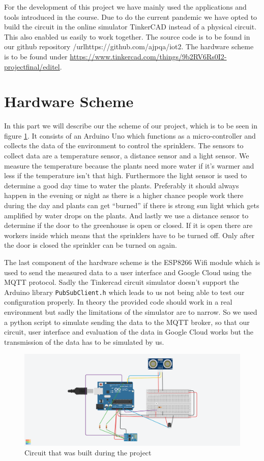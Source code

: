 \documentclass{article}
\begin{document}
For the development of this project we have mainly used the applications and tools introduced in the course. Due to do the current pandemic we have opted to build the circuit in the online simulator TinkerCAD instead of a physical circuit. This also enabled us easily to work together. The source code is to be found in our github repository /url{https://github.com/ajpqa/iot2}. The hardware scheme is to be found under \url{https://www.tinkercad.com/things/9b2RV6Rs0I2-projectfinal/editel}.

\section{Hardware Scheme}
In this part we will describe our the scheme of our project, which is to be seen in figure \ref{fig:scheme}. It consists of an Arduino Uno which functions as a micro-controller and collects the data of the environment to control the sprinklers. The sensors to collect data are a temperature sensor, a distance sensor and a light sensor. We measure the temperature because the plants need more water if it's warmer and less if the temperature isn't that high. Furthermore the light sensor is used to determine a good day time to water the plants. Preferably it should always happen in the evening or night as there is a higher chance people work there during the day and plants can get \enquote{burned} if there is strong sun light which gets amplified by water drops on the plants. And lastly we use a distance sensor to determine if the door to the greenhouse is open or closed. If it is open there are workers inside which means that the sprinklers have to be turned off. Only after the door is closed the sprinkler can be turned on again.\par 
The last component of the hardware scheme is the ESP8266 Wifi module which is used to send the measured data to a user interface and Google Cloud using the MQTT protocol. Sadly the Tinkercad circuit simulator doesn't support the Arduino library \texttt{PubSubClient.h} which leads to us not being able to test our configuration properly. In theory the provided code should work in a real environment but sadly the limitations of the simulator are to narrow. So we used a python script to simulate sending the data to the MQTT broker, so that our circuit, user interface and evaluation of the data in Google Cloud works but the transmission of the data has to be simulated by us. 
\begin{figure}
    \centering
	\includegraphics[scale=0.3]{scheme.png}
	\caption{Circuit that was built during the project}
	\label{fig:scheme}
\end{figure}
\end{document}
